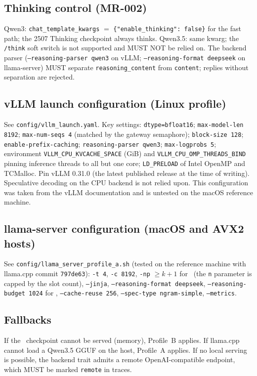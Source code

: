 \documentclass[11pt,a4paper]{article}
\begin{document}
\subsection{Thinking control (MR-002)}
\begin{sloppypar}Qwen3: \texttt{chat\_template\_kwargs} $=$ \texttt{\{"enable\_thinking": false\}} for the fast path; the 2507 Thinking checkpoint always thinks. Qwen3.5: same kwarg; the \texttt{/think} soft switch is not supported and MUST NOT be relied on. The backend parser (\texttt{--reasoning-parser qwen3} on vLLM; \texttt{--reasoning-format deepseek} on llama-server) MUST separate \texttt{reasoning\_content} from \texttt{content}; replies without separation are rejected.\end{sloppypar}
\subsection{vLLM launch configuration (Linux profile)}
\begin{sloppypar}See \texttt{config/vllm\_launch.yaml}. Key settings: \texttt{dtype=bfloat16}; \texttt{max-model-len 8192}; \texttt{max-num-seqs 4} (matched by the gateway semaphore); \texttt{block-size 128}; \texttt{enable-prefix-caching}; \texttt{reasoning-parser qwen3}; \texttt{max-logprobs 5}; environment \texttt{VLLM\_CPU\_\allowbreak KVCACHE\_\allowbreak SPACE} (GiB) and \texttt{VLLM\_CPU\_\allowbreak OMP\_\allowbreak THREADS\_\allowbreak BIND} pinning inference threads to all but one core; \texttt{LD\_PRELOAD} of Intel OpenMP and TCMalloc. Pin vLLM 0.31.0 (the latest published release at the time of writing). Speculative decoding on the CPU backend is not relied upon. This configuration was taken from the vLLM documentation and is untested on the macOS reference machine.\end{sloppypar}
\subsection{llama-server configuration (macOS and AVX2 hosts)}
See \texttt{config/llama\_server\_profile\_a.sh} (tested on the reference machine with llama.cpp commit \texttt{797de63}): \texttt{-t 4}, \texttt{-c 8192}, \texttt{-np} $\ge k+1$ for \Sone\ (the \texttt{n} parameter is capped by the slot count), \texttt{--jinja}, \texttt{--reasoning-format deepseek}, \texttt{--reasoning-budget 1024} for \Stwo, \texttt{--cache-reuse 256}, \texttt{--spec-type ngram-simple}, \texttt{--metrics}.
\subsection{Fallbacks}
If the \Stwo\ checkpoint cannot be served (memory), Profile~B applies. If llama.cpp cannot load a Qwen3.5 GGUF on the host, Profile~A applies. If no local serving is possible, the backend trait admits a remote OpenAI-compatible endpoint, which MUST be marked \texttt{remote} in traces.
\end{document}
